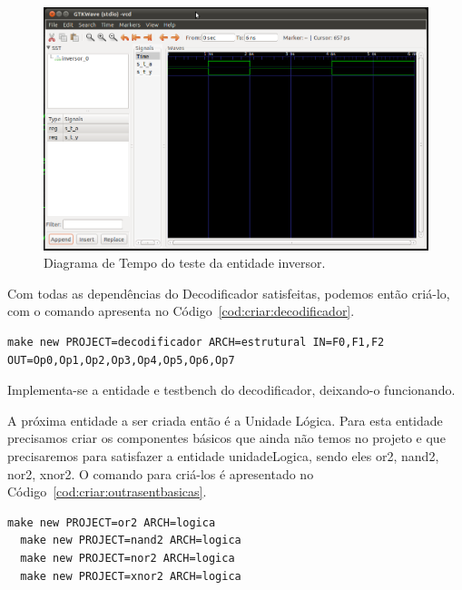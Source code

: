 \documentclass[a4paper,11pt]{report}
\begin{document}
\begin{figure}[H]
\centering
\includegraphics[width=1\textwidth]{figuras/gtw_inversor.png}
\caption{Diagrama de Tempo do teste da entidade inversor.}
\label{fig:gtw:inversor}
\end{figure}







Com todas as dependências do Decodificador satisfeitas, podemos então criá-lo, com o comando apresenta no Código~\ref{cod:criar:decodificador}.

\lstset{numbers=left, numberstyle=\tiny, stepnumber=1, numbersep=3pt}
\begin{lstlisting}[label=cod:criar:decodificador,caption=Comando para a criar a entidade Decodificador.]
  make new PROJECT=decodificador ARCH=estrutural IN=F0,F1,F2 OUT=Op0,Op1,Op2,Op3,Op4,Op5,Op6,Op7
\end{lstlisting}

Implementa-se a entidade e testbench do decodificador, deixando-o funcionando.

A próxima entidade a ser criada então é a Unidade Lógica. Para esta entidade precisamos criar os componentes básicos que ainda não temos no projeto e que precisaremos para satisfazer a entidade unidadeLogica, sendo eles or2, nand2, nor2, xnor2. O comando para criá-los é apresentado no Código~\ref{cod:criar:outrasentbasicas}.

\lstset{numbers=left, numberstyle=\tiny, stepnumber=1, numbersep=3pt}
\begin{lstlisting}[label=cod:criar:outrasentbasicas,caption=Comando para a criar entidades básicas para a Unidade Lógica.]
  make new PROJECT=or2 ARCH=logica
  make new PROJECT=nand2 ARCH=logica
  make new PROJECT=nor2 ARCH=logica
  make new PROJECT=xnor2 ARCH=logica
\end{lstlisting}
\end{document}
